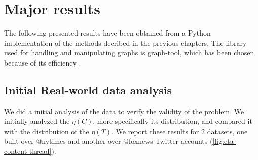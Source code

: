 \section{Major results}

The following presented results have been obtained from a Python
implementation of the methods decribed in the previous chapters. The library used
for handling and manipulating graphs is graph-tool, which has been chosen
because of its efficiency \cite{peixoto_graph-tool_2014}.

\subsection{Initial Real-world data analysis}%
\label{sub:validity_problem_definition}

We did a initial analysis of the data to verify the validity of the problem. We
initially analyzed the $\eta(C)$, more specifically its distribution, and
compared it with the distribution of the $\eta(T)$. We report these results for
$2$ datasets, one built over @nytimes and another over @foxnews Twitter
accounts \footnotemark (\autoref{fig:eta-content-thread}).



